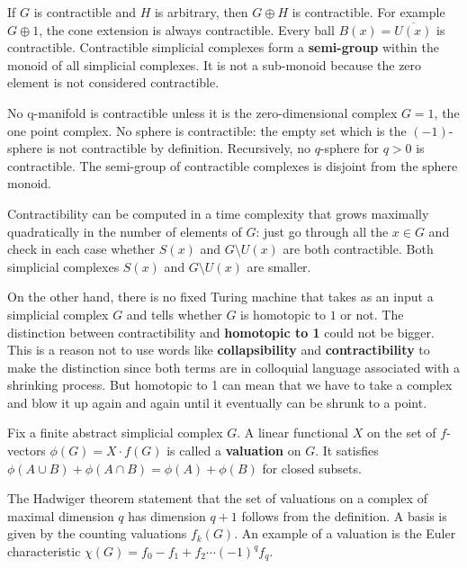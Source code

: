 \documentclass[12pt]{amsart}
\begin{document}
\vspace{3mm}
If $G$ is contractible and $H$ is arbitrary, then $G \oplus H$ is 
contractible. For example $G \oplus 1$, the cone extension is always
contractible. Every ball $B(x) = \overline{U(x)}$ is contractible. 
Contractible simplicial complexes form a {\bf semi-group} within the 
monoid of all simplicial complexes. It is not a sub-monoid because the 
zero element is not considered contractible. 

\vspace{3mm}
No q-manifold is contractible unless it is the zero-dimensional complex
$G=1$, the one point complex. No sphere is contractible: the empty set which is 
the $(-1)$-sphere is not contractible by definition. Recursively, no
$q$-sphere for $q>0$ is contractible.  The semi-group of contractible 
complexes is disjoint from the sphere monoid. 

\vspace{3mm}
Contractibility can be computed in a time complexity that grows
maximally quadratically in the number of elements of $G$: just go 
through all the $x \in G$ and check in each case whether $S(x)$ and
$G \setminus U(x)$ are both contractible. Both 
simplicial complexes $S(x)$ and $G \setminus U(x)$ are smaller. 

\vspace{3mm}
On the other hand, there is no fixed Turing machine that takes as 
an input a simplicial complex $G$ and tells whether $G$ is homotopic
to $1$ or not. The distinction between contractibility and {\bf homotopic to 1}
could not be bigger. This is a reason not to use words like {\bf collapsibility}
and {\bf contractibility} to make the distinction since both terms are in 
colloquial language associated with a shrinking process. But homotopic to 1
can mean that we have to take a complex and blow it up again and again until 
it eventually can be shrunk to a point. 


\vspace{3mm}
Fix a finite abstract simplicial complex $G$. 
A linear functional $X$ on the set of $f$-vectors $\phi(G) = X \cdot f(G)$
is called a {\bf valuation} on $G$.
It satisfies $\phi(A \cup B) + \phi(A \cap B) = \phi(A) + \phi(B)$ for 
closed subsets. 

\vspace{3mm}
The Hadwiger theorem statement that the set of 
valuations on a complex of maximal dimension $q$ has
dimension $q+1$ follows from the definition. A basis is 
given by the counting valuations $f_k(G)$. An example of a valuation is 
the Euler characteristic $\chi(G) = f_0-f_1+f_2 \cdots (-1)^q f_q$. 
\end{document}
